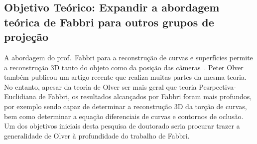 \documentclass[a4paper,titlepage]{article}
\begin{document}
\subsection{Objetivo Teórico: Expandir a abordagem teórica de Fabbri para outros
grupos de projeção}

A abordagem do prof.\ Fabbri para a reconstrução de curvas e superfícies permite
a reconstrução 3D tanto do objeto como da posição das
câmeras~\cite{fabbri2016multiview}. Peter Olver também publicou um
artigo recente que realiza muitas partes da mesma teoria. No entanto, apesar da
teoria de Olver ser mais geral que teoria Pesrpectiva-Euclidiana de Fabbri, os resultados
alcançados por Fabbri foram mais profundos, por exemplo sendo capaz de
determinar a reconstrução 3D da torção de curvas, bem como determinar a equação
diferenciais de curvas e contornos de oclusão. Um dos objetivos iniciais desta
pesquisa de doutorado seria procurar trazer a generalidade de Olver à
profundidade do trabalho de Fabbri.
\end{document}
